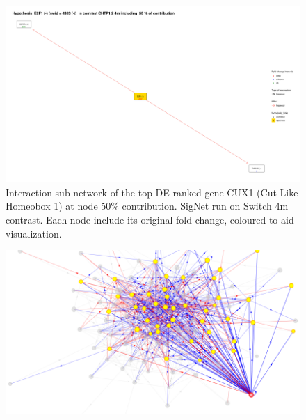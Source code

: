 \begin{figure}[!h]
    \centering
    \includegraphics[width=\textwidth, height=\textheight, keepaspectratio]{Major Thesis/figures/iut/graph/CHTP4m-E2F1.png}
    \caption{Interaction sub-network of the top DE ranked gene CUX1 (Cut Like Homeobox 1) at node 50\% contribution. SigNet run on Switch 4m contrast. Each node include its original fold-change, coloured to aid visualization.}
\end{figure}

\begin{figure}[!h]
    \centering
    \includegraphics[width=\textwidth, height=\textheight, keepaspectratio]{Major Thesis/figures/iut/graph/i3R4F-overall.png}
    \caption{}
\end{figure}

